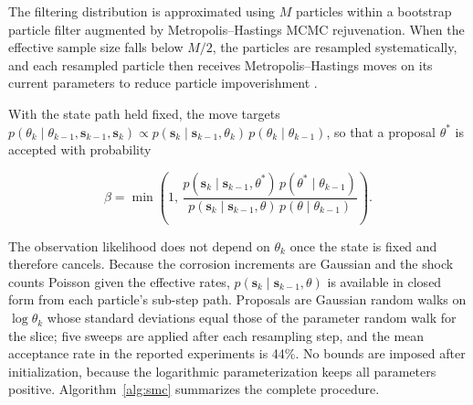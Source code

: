 \documentclass[journal]{IEEEtran}
\begin{document}
The filtering distribution is approximated using $M$ particles within
a bootstrap particle filter augmented by Metropolis--Hastings MCMC
rejuvenation. When the effective sample size falls below $M/2$, the
particles are resampled systematically, and each resampled particle
then receives Metropolis--Hastings moves on its current parameters to
reduce particle impoverishment \cite{gilks2001}.

With the state path held fixed, the move targets
$p(\theta_k\mid\theta_{k-1},\mathbf{s}_{k-1},\mathbf{s}_k)\propto
p(\mathbf{s}_k\mid\mathbf{s}_{k-1},\theta_k)\,p(\theta_k\mid\theta_{k-1})$,
so that a proposal $\theta^*$ is accepted with probability

\begin{equation}
\beta =
\min\!\left(
1,\,
\frac{
p(\mathbf{s}_k\mid\mathbf{s}_{k-1},\theta^*)\,
p(\theta^*\mid\theta_{k-1})
}{
p(\mathbf{s}_k\mid\mathbf{s}_{k-1},\theta)\,
p(\theta\mid\theta_{k-1})
}
\right).
\label{eq:mh}
\end{equation}

The observation likelihood does not depend on $\theta_k$ once the state
is fixed and therefore cancels. Because the corrosion increments are
Gaussian and the shock counts Poisson given the effective rates,
$p(\mathbf{s}_k\mid\mathbf{s}_{k-1},\theta)$ is available in closed form
from each particle's sub-step path. Proposals are Gaussian random walks
on $\log\theta_k$ whose standard deviations equal those of the
parameter random walk for the slice; five sweeps are applied after each
resampling step, and the mean acceptance rate in the reported
experiments is 44\%. No bounds are imposed after initialization,
because the logarithmic parameterization keeps all parameters positive.
Algorithm~\ref{alg:smc} summarizes the complete procedure.
\end{document}
